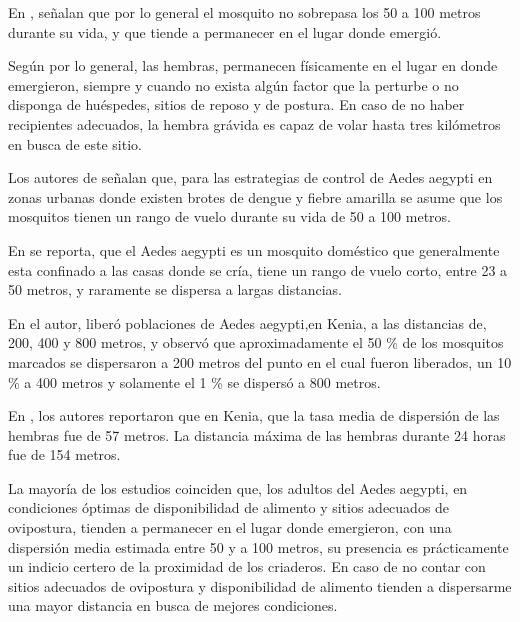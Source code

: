 En \cite{cabezas2005dengue}, señalan que por lo general el mosquito no sobrepasa los 50 a 100
metros durante su vida, y que tiende a permanecer en el lugar donde emergió.

Según \cite{ThironIzcazaJ2003} por lo general, las hembras, permanecen físicamente en el lugar en
donde emergieron, siempre y cuando no exista algún factor que la perturbe o no disponga de
huéspedes, sitios de reposo y de postura. En caso de no haber recipientes adecuados, la hembra
grávida es capaz de volar hasta tres kilómetros en busca de este sitio.

Los autores de \cite{dengueUruguayCap8} señalan que, para las estrategias de control de Aedes
aegypti en zonas urbanas donde existen brotes de dengue y fiebre amarilla se asume que los
mosquitos tienen un rango de vuelo durante su vida de 50 a 100 metros.

En \cite{luevano1993ciclo} se reporta, que el Aedes aegypti es un mosquito doméstico que
generalmente esta confinado a las casas donde se cría, tiene un rango de vuelo corto, entre 23 a
50 metros, y raramente se dispersa a largas distancias.

En \cite{mcdonald1977population} el autor, liberó poblaciones de Aedes aegypti,en Kenia, a las
distancias de, 200, 400 y 800 metros, y observó que aproximadamente el 50 \% de los mosquitos
marcados se dispersaron a 200 metros del punto en el cual fueron liberados, un 10 \% a 400 metros
y solamente el 1 \% se dispersó a 800 metros.

En \cite{trpis1986dispersal}, los autores reportaron que en Kenia, que la tasa media de dispersión
de las hembras fue de 57 metros. La distancia máxima de las hembras durante 24 horas fue de 154
metros.

La mayoría de los estudios coinciden que, los adultos del Aedes aegypti, en condiciones óptimas de
disponibilidad de alimento y sitios adecuados de ovipostura, tienden a permanecer en el lugar
donde emergieron, con una dispersión media estimada entre 50 y a 100 metros, su presencia es
prácticamente un indicio certero de la proximidad de los criaderos. En caso de no contar con
sitios adecuados de ovipostura y disponibilidad de alimento tienden a dispersarme una mayor
distancia en busca de mejores condiciones.
